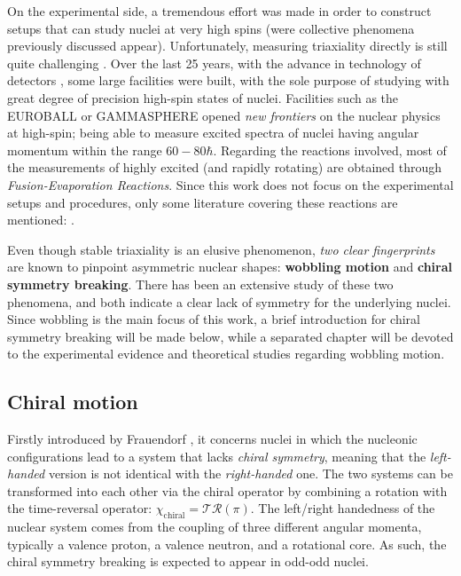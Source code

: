 On the experimental side, a tremendous effort was made in order to construct setups that can study nuclei at very high spins (were collective phenomena previously discussed appear). Unfortunately, measuring triaxiality directly is still quite challenging \cite{hamamoto2016interplay,budaca2018tilted}. Over the last 25 years, with the advance in technology of detectors \cite{henning2012stability}, some large facilities were built, with the sole purpose of studying with great degree of precision high-spin states of nuclei. Facilities such as the EUROBALL \cite{simpson1997euroball} or GAMMASPHERE \cite{lee1990gammasphere} opened \emph{new frontiers} on the nuclear physics at high-spin; being able to measure excited spectra of nuclei having angular momentum within the range $60-80\hbar$. Regarding the reactions involved, most of the measurements of highly excited (and rapidly rotating) are obtained through \emph{Fusion-Evaporation Reactions}. Since this work does not focus on the experimental setups and procedures, only some literature covering these reactions are mentioned: \cite{gu2007theoretical,henning2012stability,ayangeakaa2013exotic,matta2017exotic,das2018nuclear,lewis2019lifetime,sensharma2021wobbling}.

Even though stable triaxiality is an elusive phenomenon, \emph{two clear fingerprints} are known to pinpoint asymmetric nuclear shapes: \textbf{wobbling motion} and \textbf{chiral symmetry breaking}. There has been an extensive study of these two phenomena, and both indicate a clear lack of symmetry for the underlying nuclei. Since wobbling is the main focus of this work, a brief introduction for chiral symmetry breaking will be made below, while a separated chapter will be devoted to the experimental evidence and theoretical studies regarding wobbling motion.

\subsection{Chiral motion}
\label{chiral-section}

Firstly introduced by Frauendorf \cite{frauendorf1997tilted}, it concerns nuclei in which the nucleonic configurations lead to a system that lacks \emph{chiral symmetry}, meaning that the \emph{left-handed} version is not identical with the \emph{right-handed} one. The two systems can be transformed into each other via the chiral operator by combining a rotation with the time-reversal operator: $\chi_\text{chiral}=\mathcal{T}\mathcal{R}(\pi)$. The left/right handedness of the nuclear system comes from the coupling of three different angular momenta, typically a valence proton, a valence neutron, and a rotational core. As such, the chiral symmetry breaking is expected to appear in odd-odd nuclei.


